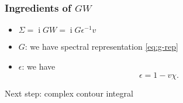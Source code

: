 \documentclass[t]{beamer}
\DeclareMathOperator{\ii}{i}
\begin{document}
\begin{frame}
\frametitle{Ingredients of $GW$}

\begin{itemize}
    \item $\Sigma = \ii GW = \ii G \epsilon^{-1} v$
    \item $G$: we have spectral representation \eqref{eq:g-rep}
    \item $\epsilon$: we have 
        \begin{equation}
            \epsilon = 1 - v \chi.
        \end{equation}
\end{itemize}    

Next step: complex contour integral

\end{frame}
\end{document}

